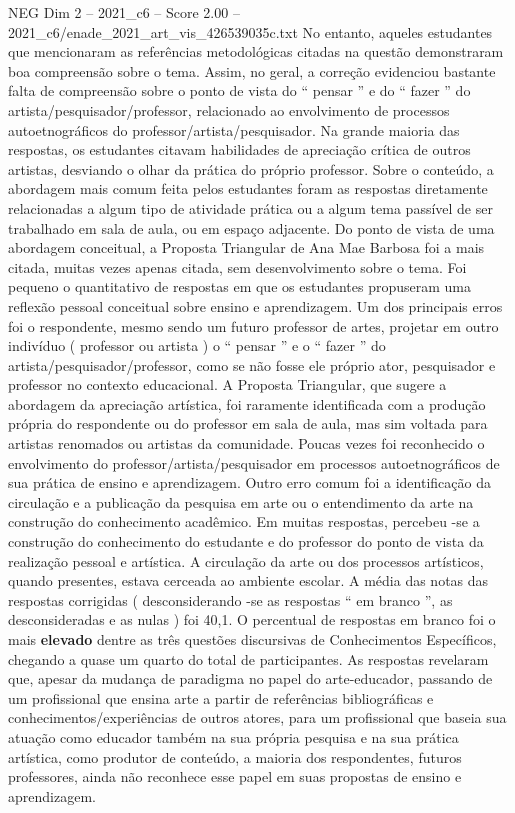 \begin{textsample}{NEG Dim 2 – 2021\_c6 – Score 2.00 – 2021\_c6/enade\_2021\_art\_vis\_426539035c.txt}
No entanto, aqueles estudantes que mencionaram as referências metodológicas citadas na questão demonstraram boa compreensão sobre o tema.
Assim, no geral, a correção evidenciou bastante falta de compreensão sobre o ponto de vista do “ pensar ” e do “ fazer ” do artista/pesquisador/professor, relacionado ao envolvimento de processos autoetnográficos do professor/artista/pesquisador.
Na grande maioria das respostas, os estudantes citavam habilidades de apreciação crítica de outros artistas, desviando o olhar da prática do próprio professor.
Sobre o conteúdo, a abordagem mais comum feita pelos estudantes foram as respostas diretamente relacionadas a algum tipo de atividade prática ou a algum tema passível de ser trabalhado em sala de aula, ou em espaço adjacente.
Do ponto de vista de uma abordagem conceitual, a Proposta Triangular de Ana Mae Barbosa foi a mais citada, muitas vezes apenas citada, sem desenvolvimento sobre o tema.
Foi pequeno o quantitativo de respostas em que os estudantes propuseram uma reflexão pessoal conceitual sobre ensino e aprendizagem.
Um dos principais erros foi o respondente, mesmo sendo um futuro professor de artes, projetar em outro indivíduo ( professor ou artista ) o “ pensar ” e o “ fazer ” do artista/pesquisador/professor, como se não fosse ele próprio ator, pesquisador e professor no contexto educacional.
A Proposta Triangular, que sugere a abordagem da apreciação artística, foi raramente identificada com a produção própria do respondente ou do professor em sala de aula, mas sim voltada para artistas renomados ou artistas da comunidade.
Poucas vezes foi reconhecido o envolvimento do professor/artista/pesquisador em processos autoetnográficos de sua prática de ensino e aprendizagem.
Outro erro comum foi a identificação da circulação e a publicação da pesquisa em arte ou o entendimento da arte na construção do conhecimento acadêmico.
Em muitas respostas, percebeu -se a construção do conhecimento do estudante e do professor do ponto de vista da realização pessoal e artística.
A circulação da arte ou dos processos artísticos, quando presentes, estava cerceada ao ambiente escolar.
A média das notas das respostas corrigidas ( desconsiderando -se as respostas “ em branco ”, as desconsideradas e as nulas ) foi 40,1.
O percentual de respostas em branco foi o mais \textbf{elevado} dentre as três questões discursivas de Conhecimentos Específicos, chegando a quase um quarto do total de participantes.
As respostas revelaram que, apesar da mudança de paradigma no papel do arte-educador, passando de um profissional que ensina arte a partir de referências bibliográficas e conhecimentos/experiências de outros atores, para um profissional que baseia sua atuação como educador também na sua própria pesquisa e na sua prática artística, como produtor de conteúdo, a maioria dos respondentes, futuros professores, ainda não reconhece esse papel em suas propostas de ensino e aprendizagem.

\end{textsample}

